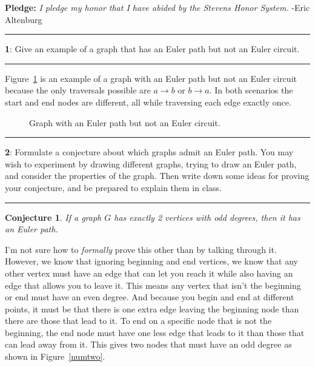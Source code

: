 \documentclass[11pt]{article}
\newtheorem{conjecture}{Conjecture}
\newcommand\question[2]{\vspace{.25in}\hrule\textbf{#1}: #2\vspace{.5em}\hrule\vspace{.10in}}
\begin{document}
\raggedright
\newcommand\NAME{Eric Altenburg}  %
\newcommand\COURSE{MA-240}
\newcommand\HWNUM{15}              %


\textbf{Pledge:} \textit{I pledge my honor that I have abided by the Stevens Honor System.} -Eric Altenburg

\question{1}{Give an example of a graph that has an Euler path but not an Euler circuit.}
Figure~\ref{ep_nec} is an example of a graph with an Euler path but not an Euler circuit because the only traversals possible are $a \rightarrow b$ or $b \rightarrow a$. In both scenarios the start and end nodes are different, all while traversing each edge exactly once.
\begin{figure}[ht]
	\centering
	\caption{Graph with an Euler path but not an Euler circuit.}
	\label{ep_nec}
\end{figure}

\question{2}{Formulate a conjecture about which graphs admit an Euler path. You may wish to experiment by drawing different graphs, trying to draw an Euler path, and consider the properties of the graph. Then write down some ideas for proving your conjecture, and be prepared to explain them in class.}

\begin{conjecture}
	If a graph $G$ has exactly 2 vertices with odd degrees, then it has an Euler path.
\end{conjecture}

I'm not sure how to \textit{formally} prove this other than by talking through it. However, we know that ignoring beginning and end vertices, we know that any other vertex must have an edge that can let you reach it while also having an edge that allows you to leave it. This means any vertex that isn't the beginning or end must have an even degree. And because you begin and end at different points, it must be that there is one extra edge leaving the beginning node than there are those that lead to it. To end on a specific node that is not the beginning, the end node must have one less edge that leads to it than those that can lead away from it. This gives two nodes that must have an odd degree as shown in Figure~\ref{numtwo}.
\end{document}
